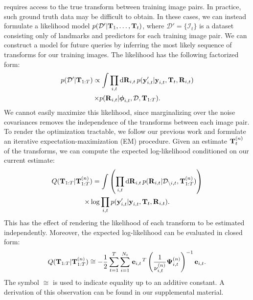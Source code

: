  requires access to the true transform between
training image pairs.  In practice, such ground truth data may be difficult
to obtain.  In these cases, we can instead formulate a likelihood model $p(\mathcal{D}' \vert
\boldsymbol{\mathbf{T}}_1, \dots, \boldsymbol{\mathbf{T}}_t)$, where $\mathcal{D}' = \{\mathcal{I}_t\}$ is a dataset consisting only of
landmarks and predictors for each training image pair. We can construct a model
for future queries by inferring the most likely sequence of transforms for our
training images.  The likelihood has the following factorized form:
\begin{multline}
  p(\mathcal{D}' \vert \boldsymbol{\mathbf{T}}_{1:T}) \propto \int \prod_{i,t}
  \mathrm{d}\boldsymbol{\mathbf{R}}_{i,t}\,
  p(\boldsymbol{\mathbf{y}}_{i,t}' \vert \boldsymbol{\mathbf{y}}_{i,t}, 
    \boldsymbol{\mathbf{T}}_t, \boldsymbol{\mathbf{R}}_{i,t}) \nonumber \\
  \times p(\boldsymbol{\mathbf{R}}_{i,t}\vert \boldsymbol{\mathbf{\phi}}_{i,t},
    \mathcal{D}, \boldsymbol{\mathbf{T}}_{1:T}).
\end{multline}
We cannot easily maximize this likelihood, since marginalizing over the
noise covariances removes the independence of the transforms between
each image pair. To render the optimization tractable, we follow
our previous work \citep{VegaBrown:2013fv} and formulate an iterative expectation-maximization (EM)
procedure. Given an estimate $\boldsymbol{\mathbf{T}}_{t}^{(n)}$ of the transforms, we can
compute the expected log-likelihood conditioned on our current estimate: 
\begin{multline}
  Q(\boldsymbol{\mathbf{T}}_{1:T} \vert \boldsymbol{\mathbf{T}}_{1:T}^{(n)}) = 
    \int \left(\prod_{i,t}\mathrm{d}\boldsymbol{\mathbf{R}}_{i,t}
      \,p(\boldsymbol{\mathbf{R}}_{i,t} | \mathcal{D}_{\setminus
        i,t},
      \boldsymbol{\mathbf{T}}_{1:T}^{(n)})\right)
    \\ \times \log \prod_{i,t} p(\boldsymbol{\mathbf{y}}_{i,t}' \vert
      \boldsymbol{\mathbf{y}}_{i,t}, \boldsymbol{\mathbf{T}}_t,
      \boldsymbol{\mathbf{R}}_{i,t}).
\end{multline}
This has the effect of rendering the likelihood of each transform to be
estimated independently.  Moreover, the expected log-likelihood can be
evaluated in closed form:
\begin{align}
  Q(\boldsymbol{\mathbf{T}}_{1:T} | \boldsymbol{\mathbf{T}}_{1:T}^{(n)}) \cong -\frac{1}{2}\sum_{t=1}^T
  \sum_{i=1}^{N_t} \left.{\boldsymbol{\mathbf{e}}_{i,t}}\right.^T
  \left(\frac{1}{\nu_{i,t}^{(n)}}\boldsymbol{\mathbf{\Psi}}_{i,t}^{(n)}\right)^{-1}
  \boldsymbol{\mathbf{e}}_{i,t}.
\end{align}
The symbol $\cong$ is used to indicate equality up to an additive constant. 
A derivation of this observation can be found in our supplemental material.

